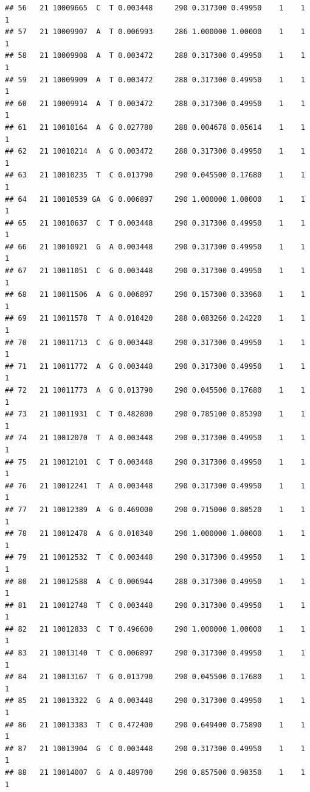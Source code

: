 \documentclass[
]{article}
\begin{document}
\begin{verbatim}
## 56   21 10009665  C  T 0.003448     290 0.317300 0.49950    1    1        1
## 57   21 10009907  A  T 0.006993     286 1.000000 1.00000    1    1        1
## 58   21 10009908  A  T 0.003472     288 0.317300 0.49950    1    1        1
## 59   21 10009909  A  T 0.003472     288 0.317300 0.49950    1    1        1
## 60   21 10009914  A  T 0.003472     288 0.317300 0.49950    1    1        1
## 61   21 10010164  A  G 0.027780     288 0.004678 0.05614    1    1        1
## 62   21 10010214  A  G 0.003472     288 0.317300 0.49950    1    1        1
## 63   21 10010235  T  C 0.013790     290 0.045500 0.17680    1    1        1
## 64   21 10010539 GA  G 0.006897     290 1.000000 1.00000    1    1        1
## 65   21 10010637  C  T 0.003448     290 0.317300 0.49950    1    1        1
## 66   21 10010921  G  A 0.003448     290 0.317300 0.49950    1    1        1
## 67   21 10011051  C  G 0.003448     290 0.317300 0.49950    1    1        1
## 68   21 10011506  A  G 0.006897     290 0.157300 0.33960    1    1        1
## 69   21 10011578  T  A 0.010420     288 0.083260 0.24220    1    1        1
## 70   21 10011713  C  G 0.003448     290 0.317300 0.49950    1    1        1
## 71   21 10011772  A  G 0.003448     290 0.317300 0.49950    1    1        1
## 72   21 10011773  A  G 0.013790     290 0.045500 0.17680    1    1        1
## 73   21 10011931  C  T 0.482800     290 0.785100 0.85390    1    1        1
## 74   21 10012070  T  A 0.003448     290 0.317300 0.49950    1    1        1
## 75   21 10012101  C  T 0.003448     290 0.317300 0.49950    1    1        1
## 76   21 10012241  T  A 0.003448     290 0.317300 0.49950    1    1        1
## 77   21 10012389  A  G 0.469000     290 0.715000 0.80520    1    1        1
## 78   21 10012478  A  G 0.010340     290 1.000000 1.00000    1    1        1
## 79   21 10012532  T  C 0.003448     290 0.317300 0.49950    1    1        1
## 80   21 10012588  A  C 0.006944     288 0.317300 0.49950    1    1        1
## 81   21 10012748  T  C 0.003448     290 0.317300 0.49950    1    1        1
## 82   21 10012833  C  T 0.496600     290 1.000000 1.00000    1    1        1
## 83   21 10013140  T  C 0.006897     290 0.317300 0.49950    1    1        1
## 84   21 10013167  T  G 0.013790     290 0.045500 0.17680    1    1        1
## 85   21 10013322  G  A 0.003448     290 0.317300 0.49950    1    1        1
## 86   21 10013383  T  C 0.472400     290 0.649400 0.75890    1    1        1
## 87   21 10013904  G  C 0.003448     290 0.317300 0.49950    1    1        1
## 88   21 10014007  G  A 0.489700     290 0.857500 0.90350    1    1        1

\end{verbatim}
\end{document}
